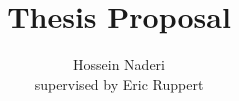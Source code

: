 \documentclass[12pt]{article}
\begin{document}
\title{Thesis Proposal}
\author{Hossein Naderi \\supervised by Eric Ruppert}
\maketitle

\end{document}
